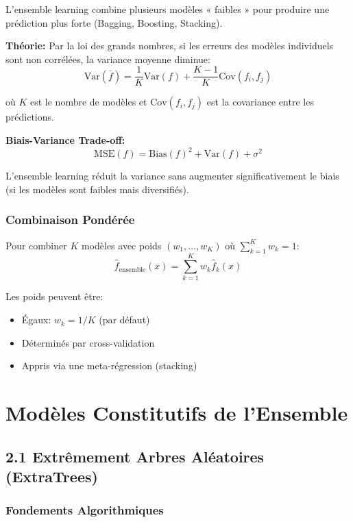 \documentclass[12pt,a4paper,french]{article}
\begin{document}
L'ensemble learning combine plusieurs modèles « faibles » pour produire une prédiction plus forte (Bagging, Boosting, Stacking).

\textbf{Théorie:} Par la loi des grands nombres, si les erreurs des modèles individuels sont non corrélées, la variance moyenne diminue:
\begin{equation}
\text{Var}(\bar{f}) = \frac{1}{K} \text{Var}(f) + \frac{K-1}{K} \text{Cov}(f_i, f_j)
\end{equation}

où $K$ est le nombre de modèles et $\text{Cov}(f_i, f_j)$ est la covariance entre les prédictions.

\textbf{Biais-Variance Trade-off:}
\begin{equation}
\text{MSE}(f) = \text{Bias}(f)^2 + \text{Var}(f) + \sigma^2
\end{equation}

L'ensemble learning réduit la variance sans augmenter significativement le biais (si les modèles sont faibles mais diversifiés).

\subsubsection{Combinaison Pondérée}

Pour combiner $K$ modèles avec poids $(w_1, \ldots, w_K)$ où $\sum_{k=1}^K w_k = 1$:
\begin{equation}
\hat{f}_{\text{ensemble}}(x) = \sum_{k=1}^K w_k \hat{f}_k(x)
\end{equation}

Les poids peuvent être:
\begin{itemize}
    \item Égaux: $w_k = 1/K$ (par défaut)
    \item Déterminés par cross-validation
    \item Appris via une meta-régression (stacking)
\end{itemize}

\section{Modèles Constitutifs de l'Ensemble}

\subsection{2.1 Extrêmement Arbres Aléatoires (ExtraTrees)}

\subsubsection{Fondements Algorithmiques}
\end{document}
